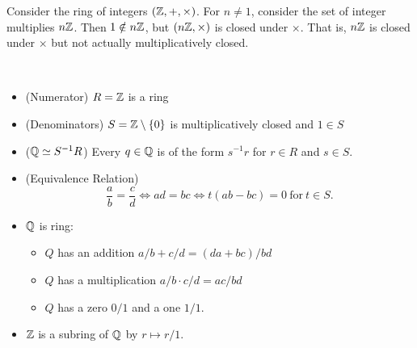\begin{observation}
	Consider the ring of integers $(\mathbb{Z},+,\times)$. For $n\neq 1$, consider the set of integer multiplies $n\mathbb{Z}$.
	Then $1\notin n\mathbb{Z}$, but $(n\mathbb{Z},\times)$ is closed under $\times$. That is, $n\mathbb{Z}$ is closed under $\times$ but not actually multiplicatively closed.
\end{observation}

\begin{note}[From $\Z$ to $\Q$]
\ \begin{itemize}
	\item (Numerator) $R=\mathbb{Z}$ is a ring
	\item (Denominators) $S=\mathbb{Z}\setminus\set{0}$ is multiplicatively closed and $1\in S$
	\item ($\mathbb{Q}\simeq S^{-1}R$) Every $q\in\mathbb{Q}$ is of the form $s^{-1}r$ for $r\in R$ and $s\in S$.
	\item (Equivalence Relation) \[
	\frac{a}{b}=\frac{c}{d}\iff ad=bc\iff t(ab-bc)=0\ \text{for}\ t\in S.
	\]
	\item $\Q$ is ring: \begin{itemize}
		\item $Q$ has an addition $a/b+c/d=(da+bc)/bd$
		\item $Q$ has a multiplication $a/b\cdot c/d=ac/bd$
		\item $Q$ has a zero $0/1$ and a one $1/1$.
	\end{itemize}
	\item $\Z$ is a subring of $\Q$ by $r\mapsto r/1$.
\end{itemize}
\end{note}

